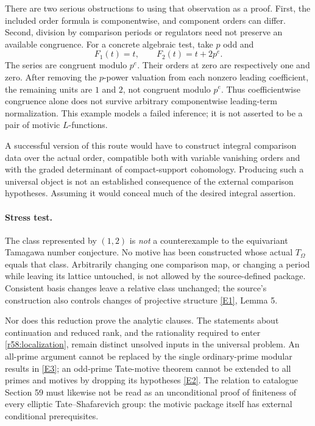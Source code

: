 \documentclass[11pt,a4paper]{article}
\newcommand{\eref}[2]{\hyperlink{extra:#1:#2}{[E#2]}}
\numberwithin{equation}{section}
\begin{document}
There are two serious obstructions to using that observation as a proof. First, the included order formula is componentwise, and component orders can differ. Second, division by comparison periods or regulators need not preserve an available congruence. For a concrete algebraic test, take $p$ odd and
\[
 F_1(t)=t,\qquad F_2(t)=t+2p^e.
\]
The series are congruent modulo $p^e$. Their orders at zero are respectively one and zero. After removing the $p$-power valuation from each nonzero leading coefficient, the remaining units are $1$ and $2$, not congruent modulo $p^e$. Thus coefficientwise congruence alone does not survive arbitrary componentwise leading-term normalization. This example models a failed inference; it is not asserted to be a pair of motivic $L$-functions.

A successful version of this route would have to construct integral comparison data over the actual order, compatible both with variable vanishing orders and with the graded determinant of compact-support cohomology. Producing such a universal object is not an established consequence of the external comparison hypotheses. Assuming it would conceal much of the desired integral assertion.

\paragraph{Stress test.}
The class represented by $(1,2)$ is \emph{not} a counterexample to the equivariant Tamagawa number conjecture. No motive has been constructed whose actual $T_\Omega$ equals that class. Arbitrarily changing one comparison map, or changing a period while leaving its lattice untouched, is not allowed by the source-defined package. Consistent basis changes leave a relative class unchanged; the source's construction also controls changes of projective structure \eref{statement}{1}, Lemma 5.

Nor does this reduction prove the analytic clauses. The statements about continuation and reduced rank, and the rationality required to enter \eqref{r58:localization}, remain distinct unsolved inputs in the universal problem. An all-prime argument cannot be replaced by the single ordinary-prime modular results in \eref{statement}{3}; an odd-prime Tate-motive theorem cannot be extended to all primes and motives by dropping its hypotheses \eref{statement}{2}. The relation to catalogue Section 59 must likewise not be read as an unconditional proof of finiteness of every elliptic Tate--Shafarevich group: the motivic package itself has external conditional prerequisites.
\end{document}
